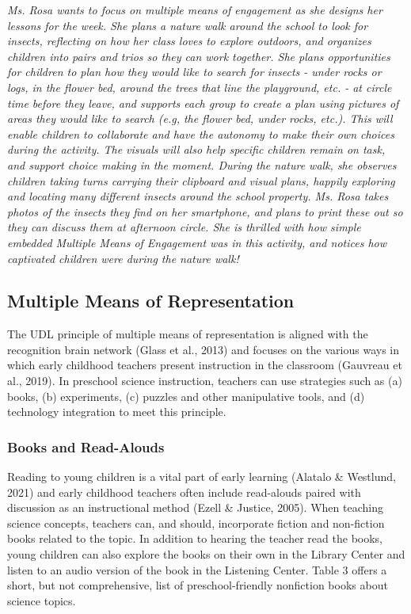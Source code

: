 \documentclass[11.5pt]{sig-alternate}
\begin{document}
\begin{large}
\emph {Ms. Rosa wants to focus on multiple means of engagement as she designs her lessons for the week. She plans a nature walk around the school to look for insects, reflecting on how her class loves to explore outdoors, and organizes children into pairs and trios so they can work together. She plans opportunities for children to plan how they would like to search for insects - under rocks or logs, in the flower bed, around the trees that line the playground, etc. - at circle time before they leave, and supports each group to create a plan using pictures of areas they would like to search (e.g, the flower bed, under rocks, etc.). This will enable children to collaborate and have the autonomy to make their own choices during the activity. The visuals will also help specific children remain on task, and support choice making in the moment. During the nature walk, she observes children taking turns carrying their clipboard and visual plans, happily exploring and locating many different insects around the school property. Ms. Rosa takes photos of the insects they find on her smartphone, and plans to print these out so they can discuss them at afternoon circle. She is thrilled with how simple embedded Multiple Means of Engagement was in this activity, and notices how captivated children were during the nature walk!}

\subsection*{Multiple Means of Representation}

The UDL principle of multiple means of representation is aligned with the recognition brain network (Glass et al., 2013) and focuses on the various ways in which early childhood teachers present instruction in the classroom (Gauvreau et al., 2019). In preschool science instruction, teachers can use strategies such as (a) books, (b) experiments, (c) puzzles and other manipulative tools, and (d) technology integration to meet this principle.

\subsubsection*{Books and Read-Alouds}

Reading to young children is a vital part of early learning (Alatalo \& Westlund, 2021) and early childhood teachers often include read-alouds paired with discussion as an instructional method (Ezell \& Justice, 2005). When teaching science concepts, teachers can, and should, incorporate fiction and non-fiction books related to the topic. In addition to hearing the teacher read the books, young children can also explore the books on their own in the Library Center and listen to an audio version of the book in the Listening Center. Table 3 offers a short, but not comprehensive, list of preschool-friendly nonfiction books about science topics. 


\end{large}
\end{document}
